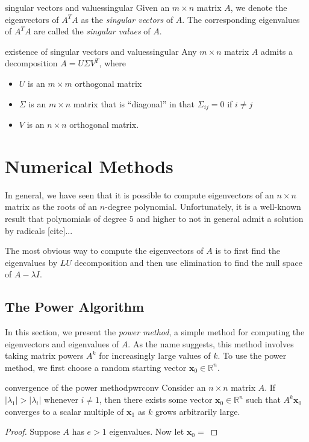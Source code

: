 \documentclass{article}
\let\vec\mathbf
\begin{document}
\begin{definition}{singular vectors and values}{singular}
  Given an $m \times n$ matrix $A$, we denote the eigenvectors of $A^TA$ as the \textit{singular vectors} of $A$. The corresponding eigenvalues of $A^TA$ are called the \textit{singular values} of $A$.
\end{definition}

\begin{theorem}{existence of singular vectors and values}{singular}
  Any $m \times n$ matrix $A$ admits a decomposition $A = U \Sigma V^T$, where
  \begin{itemize}
    \item $U$ is an $m \times m$ orthogonal matrix
    \item $\Sigma$ is an $m \times n$ matrix that is ``diagonal'' in that $\Sigma_{ij} = 0$ if $i \neq j$
    \item $V$ is an $n \times n$ orthogonal matrix.
  \end{itemize}
\end{theorem}

\section{Numerical Methods}
In general, we have seen that it is possible to compute eigenvectors of an $n \times n$ matrix as the roots of an $n$-degree polynomial. Unfortunately, it is a well-known result that polynomials of degree $5$ and higher to not in general admit a solution by radicals [cite]...

The most obvious way to compute the eigenvectors of $A$ is to first find the eigenvalues by $LU$ decomposition and then use elimination to find the null space of $A - \lambda I$.

\subsection{The Power Algorithm}
In this section, we present the \textit{power method}, a simple method for computing the eigenvectors and eigenvalues of $A$. As the name suggests, this method involves taking matrix powers $A^k$ for increasingly large values of $k$. To use the power method, we first choose a random starting vector $\vec{x}_0 \in \mathbb{R}^n$.

\begin{theorem}{convergence of the power method}{pwrconv}
  Consider an $n \times n$ matrix $A$. If $|\lambda_1| > |\lambda_i|$ whenever $i \neq 1$, then there exists some vector $\vec{x}_0 \in \mathbb{R}^n$ such that $A^k\vec{x}_0$ converges to a scalar multiple of $\vec{x}_1$ as $k$ grows arbitrarily large.
\end{theorem}
\begin{proof}
  Suppose $A$ has $e > 1$ eigenvalues. Now let $\vec{x}_0 = $
\end{proof}
\end{document}
